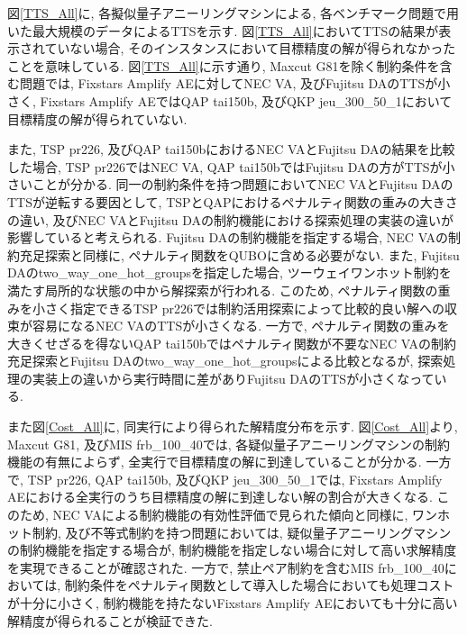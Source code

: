 \documentclass[submit,techrep,noauthor]{ipsj}
\begin{document}

図\ref{TTS_All}に, 各擬似量子アニーリングマシンによる, 各ベンチマーク問題で用いた最大規模のデータによるTTSを示す. 図\ref{TTS_All}においてTTSの結果が表示されていない場合, そのインスタンスにおいて目標精度の解が得られなかったことを意味している. 図\ref{TTS_All}に示す通り, Maxcut G81を除く制約条件を含む問題では, Fixstars Amplify AEに対してNEC VA, 及びFujitsu DAのTTSが小さく, Fixstars Amplify AEではQAP tai150b, 及びQKP jeu\_300\_50\_1において目標精度の解が得られていない. 

また, TSP pr226, 及びQAP tai150bにおけるNEC VAとFujitsu DAの結果を比較した場合, TSP pr226ではNEC VA, QAP tai150bではFujitsu DAの方がTTSが小さいことが分かる. 同一の制約条件を持つ問題においてNEC VAとFujitsu DAのTTSが逆転する要因として, TSPとQAPにおけるペナルティ関数の重みの大きさの違い, 及びNEC VAとFujitsu DAの制約機能における探索処理の実装の違いが影響していると考えられる. Fujitsu DAの制約機能を指定する場合, NEC VAの制約充足探索と同様に, ペナルティ関数をQUBOに含める必要がない. また, Fujitsu DAのtwo\_way\_one\_hot\_groupsを指定した場合, ツーウェイワンホット制約を満たす局所的な状態の中から解探索が行われる. このため, ペナルティ関数の重みを小さく指定できるTSP pr226では制約活用探索によって比較的良い解への収束が容易になるNEC VAのTTSが小さくなる. 一方で, ペナルティ関数の重みを大きくせざるを得ないQAP tai150bではペナルティ関数が不要なNEC VAの制約充足探索とFujitsu DAのtwo\_way\_one\_hot\_groupsによる比較となるが, 探索処理の実装上の違いから実行時間に差がありFujitsu DAのTTSが小さくなっている.

また図\ref{Cost_All}に, 同実行により得られた解精度分布を示す. 図\ref{Cost_All}より, Maxcut G81, 及びMIS frb\_100\_40では, 各疑似量子アニーリングマシンの制約機能の有無によらず, 全実行で目標精度の解に到達していることが分かる. 一方で, TSP pr226, QAP tai150b, 及びQKP jeu\_300\_50\_1では, Fixstars Amplify AEにおける全実行のうち目標精度の解に到達しない解の割合が大きくなる. このため, NEC VAによる制約機能の有効性評価で見られた傾向と同様に, ワンホット制約, 及び不等式制約を持つ問題においては, 疑似量子アニーリングマシンの制約機能を指定する場合が, 制約機能を指定しない場合に対して高い求解精度を実現できることが確認された. 一方で, 禁止ペア制約を含むMIS frb\_100\_40においては, 制約条件をペナルティ関数として導入した場合においても処理コストが十分に小さく, 制約機能を持たないFixstars Amplify AEにおいても十分に高い解精度が得られることが検証できた. 
\end{document}
